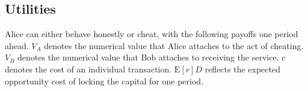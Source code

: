 \documentclass[runningheads]{llncs}
\newcommand{\sys}{Promise\xspace}
\newcommand{\rk}[1]{\todo[linecolor=red,backgroundcolor=red!25,bordercolor=blue,inline,caption={}]{Comment by Rami: #1}}
\newcommand{\dom}[1]{\todo[linecolor=green,backgroundcolor=green!25,bordercolor=green,inline,caption={}]{Comment by Dominik: #1}}
\begin{document}




\subsection{Utilities}
Alice can either behave honestly or cheat, with the following payoffs one period ahead.
$V_A$ denotes the numerical value that Alice attaches to the act of cheating.
$V_B$ denotes the numerical value that Bob attaches to receiving the service.
$c$ denotes the cost of an individual transaction. 
$\mathrm{E}[r]D$ reflects the expected opportunity cost of locking the capital for one period. %
\end{document}
